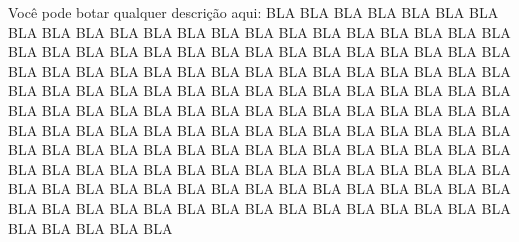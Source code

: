 Você pode botar qualquer descrição aqui: BLA BLA BLA BLA BLA BLA BLA BLA BLA BLA BLA BLA BLA BLA BLA BLA BLA BLA BLA BLA BLA BLA BLA BLA BLA BLA BLA BLA BLA BLA BLA BLA BLA BLA BLA BLA BLA BLA BLA BLA BLA BLA BLA BLA BLA BLA BLA BLA BLA BLA BLA BLA BLA BLA BLA BLA BLA BLA BLA BLA BLA BLA BLA BLA BLA BLA BLA BLA BLA BLA BLA BLA BLA BLA BLA BLA BLA BLA BLA BLA BLA BLA BLA BLA BLA BLA BLA BLA BLA BLA BLA BLA BLA BLA BLA BLA BLA BLA BLA BLA BLA BLA BLA BLA BLA BLA BLA BLA BLA BLA BLA BLA BLA BLA BLA BLA BLA BLA BLA BLA BLA BLA BLA BLA BLA BLA BLA BLA BLA BLA BLA BLA BLA BLA BLA BLA BLA BLA BLA BLA BLA BLA BLA BLA BLA BLA BLA BLA BLA BLA BLA BLA BLA BLA BLA BLA BLA BLA BLA BLA BLA BLA